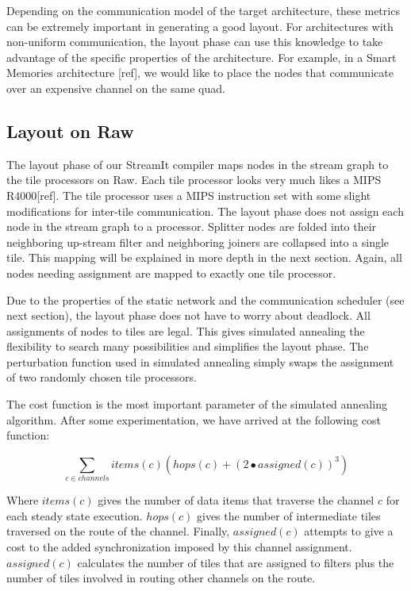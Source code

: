 Depending on the communication model of the target architecture, these
metrics can be extremely important in generating a good layout.  For
architectures with non-uniform communication, the layout phase can use
this knowledge to take advantage of the specific properties of the
architecture.  For example, in a Smart Memories architecture [ref], we
would like to place the nodes that communicate over an expensive
channel on the same quad.

\subsection{Layout on Raw}

The layout phase of our StreamIt compiler maps nodes in the stream
graph to the tile processors on Raw.  Each tile processor looks very
much likes a MIPS R4000[ref].  The tile processor uses a MIPS
instruction set with some slight modifications for inter-tile
communication.  The layout phase does not assign each node in the
stream graph to a processor.  Splitter nodes are folded into their
neighboring up-stream filter and neighboring joiners are collapsed
into a single tile.  This mapping will be explained in more depth in
the next section.  Again, all nodes needing assignment are mapped to
exactly one tile processor.

Due to the properties of the static network and the communication
scheduler (see next section), the layout phase does not have to worry
about deadlock.  All assignments of nodes to tiles are legal.  This
gives simulated annealing the flexibility to search many possibilities
and simplifies the layout phase.  The perturbation function used in
simulated annealing simply swaps the assignment of two randomly chosen
tile processors.

The cost function is the most important parameter of the simulated
annealing algorithm.  After some experimentation, we have arrived at
the following cost function: 

\[
\sum _{c \in channels} items(c) \left( hops(c) + \left( 2 \bullet
assigned(c) \right) ^{3} \right)
\]


Where \(items(c)\) gives the number of data items that traverse the
channel \(c\) for each steady state execution.  \(hops(c)\) gives the
number of intermediate tiles traversed on the route of the channel.
Finally, \(assigned(c)\) attempts to give a cost to the added
synchronization imposed by this channel assignment.  \(assigned(c)\)
calculates the number of tiles that are assigned to filters plus the
number of tiles involved in routing other channels on the route.

